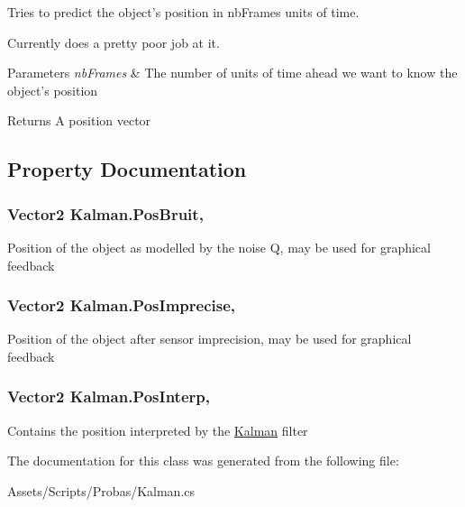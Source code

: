 Tries to predict the object's position in nb\-Frames units of time.\par
 Currently does a pretty poor job at it. 


\begin{DoxyParams}{Parameters}
{\em nb\-Frames} & The number of units of time ahead we want to know the object's position\\
\hline
\end{DoxyParams}
\begin{DoxyReturn}{Returns}
A position vector
\end{DoxyReturn}


\subsection{Property Documentation}
\hypertarget{class_kalman_a50ea03a2599d8c543a7c7b9a6bc3a5a4}{
\subsubsection[{Pos\-Bruit}]{\setlength{\rightskip}{0pt plus 5cm}Vector2 Kalman.\-Pos\-Bruit\hspace{0.3cm}{\ttfamily [get]}, {\ttfamily [set]}}}\label{class_kalman_a50ea03a2599d8c543a7c7b9a6bc3a5a4}


Position of the object as modelled by the noise Q, may be used for graphical feedback 

\hypertarget{class_kalman_a46fb936710eedfd2cf4596325a63f56f}{
\subsubsection[{Pos\-Imprecise}]{\setlength{\rightskip}{0pt plus 5cm}Vector2 Kalman.\-Pos\-Imprecise\hspace{0.3cm}{\ttfamily [get]}, {\ttfamily [set]}}}\label{class_kalman_a46fb936710eedfd2cf4596325a63f56f}


Position of the object after sensor imprecision, may be used for graphical feedback 

\hypertarget{class_kalman_a0a29646a2e1fddee8d46c928b6c7ce78}{
\subsubsection[{Pos\-Interp}]{\setlength{\rightskip}{0pt plus 5cm}Vector2 Kalman.\-Pos\-Interp\hspace{0.3cm}{\ttfamily [get]}, {\ttfamily [set]}}}\label{class_kalman_a0a29646a2e1fddee8d46c928b6c7ce78}


Contains the position interpreted by the \hyperlink{class_kalman}{Kalman} filter 



The documentation for this class was generated from the following file\-:\begin{DoxyCompactItemize}
\item 
Assets/\-Scripts/\-Probas/Kalman.\-cs\end{DoxyCompactItemize}
